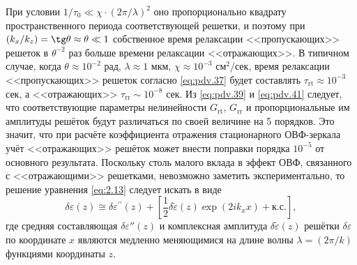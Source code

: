 При условии $1 / \tau_0 \ll \chi \cdot (2\pi / \lambda)^2$ оно пропорционально квадрату пространственного периода соответствующей решетки, и поэтому при $(k_x / k_z) = \tg\theta \approx \theta \ll 1$ собственное время релаксации <<пропускающих>> решеток в $\theta^{-2}$ раз больше времени релаксации <<отражающих>>. В типичном случае, когда $\theta \approx 10^{-2}$ рад, $\lambda \approx 1$ мкм, $\chi \approx 10^{-3}$ см${}^2$/сек, время релаксации <<пропускающих>> решеток согласно \eqref{eq:pdv.37} будет составлять $\tau_\text{rt} \approx 10^{-3}$ сек, а <<отражающих>> $\tau_\text{rr} \sim 10^{-8}$ сек. Из \eqref{eq:pdv.39} и \eqref{eq:pdv.41} следует, что соответствующие параметры нелинейности $G_\text{rt}$, $G_\text{rr}$ и пропорциональные им амплитуды решёток будут различаться по своей величине на 5 порядков. Это значит, что при расчёте коэффициента отражения стационарного ОВФ-зеркала учёт <<отражающих>> решёток может внести поправки порядка $10^{-5}$ от основного результата. Поскольку столь малого вклада в эффект ОВФ, связанного с <<отражающими>> решетками, невозможно заметить экспериментально, то решение уравнения \eqref{eq:2.13} следует искать в виде
\begin{equation}
	\label{eq:2.15}
	\delta \varepsilon(z) \cong \delta \varepsilon^{\prime \prime}(z)+\left[\frac{1}{2} \delta \tilde{\varepsilon}(z) \exp \left(2 i k_{x} x\right)+\text{к.с.}\right],
\end{equation}
где средняя составляющая $\delta \varepsilon ''(z)$ и комплексная амплитуда $\delta \tilde{\varepsilon} (z)$ решётки $\delta \varepsilon$ по координате $x$ являются медленно меняющимися на длине волны $\lambda = (2\pi / k)$ функциями координаты $z$.

